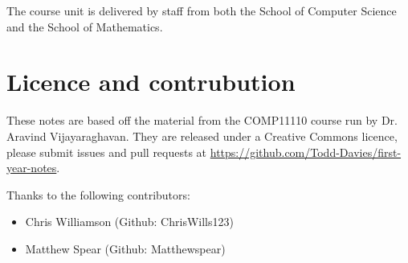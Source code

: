 The course unit is delivered by staff from both the School of Computer Science
and the School of Mathematics.

\section*{Licence and contrubution}

These notes are based off the material from the COMP11110 course run by 
Dr. Aravind Vijayaraghavan. They are released
under a Creative Commons licence, please submit issues and pull requests at
\url{https://github.com/Todd-Davies/first-year-notes}.

Thanks to the following contributors:

\begin{itemize}
\item Chris Williamson (Github: ChrisWills123)
\item Matthew Spear (Github: Matthewspear)
\end{itemize}
